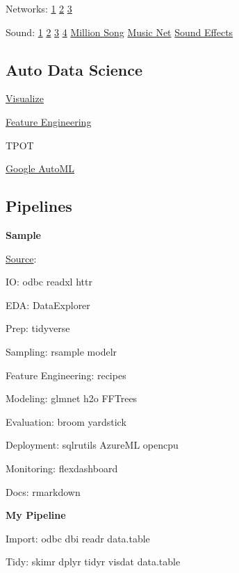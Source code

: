 \documentclass[]{book}
\begin{document}
Networks: \href{https://snap.stanford.edu/data/index.html}{1} \textbar{} \href{http://networkrepository.com/index.php}{2} \textbar{} \href{https://aminer.org/data-sna}{3}

Sound: \href{http://labrosa.ee.columbia.edu/millionsong/}{1} \textbar{} \href{https://github.com/mdeff/fma}{2} \textbar{} \href{http://homes.cs.washington.edu/~thickstn/musicnet.html}{3} \textbar{} \href{https://datasets.freesound.org/fsd/}{4} \textbar{} \href{https://labrosa.ee.columbia.edu/millionsong/}{Million Song} \textbar{} \href{https://homes.cs.washington.edu/~thickstn/musicnet.html}{Music Net} \textbar{} \href{http://bbcsfx.acropolis.org.uk/}{Sound Effects}

\hypertarget{auto-data-science}{%
\subsection{Auto Data Science}\label{auto-data-science}}

\href{http://holoviews.org}{Visualize}

\href{https://www.featuretools.com}{Feature Engineering}

TPOT

\href{https://cloud.google.com/automl/}{Google AutoML}

\hypertarget{pipelines}{%
\subsection{Pipelines}\label{pipelines}}

\textbf{Sample}

\href{https://mobile.twitter.com/TheStephLocke/status/990251709531344896}{Source}:

IO: odbc readxl httr

EDA: DataExplorer

Prep: tidyverse

Sampling: rsample modelr

Feature Engineering: recipes

Modeling: glmnet h2o FFTrees

Evaluation: broom yardstick

Deployment: sqlrutils AzureML opencpu

Monitoring: flexdashboard

Docs: rmarkdown

\textbf{My Pipeline}

Import: odbc dbi readr data.table

Tidy: skimr dplyr tidyr visdat data.table
\end{document}
